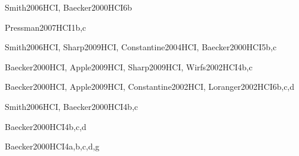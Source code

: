 \begin{syllabus}
	\begin{unit}{\HCIFoundations}{}{Smith2006HCI, Baecker2000HCI}{6}{b}
		\HCIFoundationsAllTopics
		\HCIFoundationsAllLearningOutcomes
	\end{unit}
	
	\begin{unit}{\PLObjectOrientedProgramming}{}{Pressman2007HCI}{1}{b,c}
		\PLObjectOrientedProgramming
	\end{unit}
	
	
	\begin{unit}{\HCIUsercentereddesignandtesting}{}{Smith2006HCI, Sharp2009HCI, Constantine2004HCI, Baecker2000HCI}{5}{b,c}
		\HCIUsercentereddesignandtestingAllTopics
		\HCIUsercentereddesignandtestingAllLearningOutcomes
	\end{unit}
	
	
	\begin{unit}{\HCIDesigningInteraction}{}{Baecker2000HCI, Apple2009HCI, Sharp2009HCI, Wirfs2002HCI}{4}{b,c}
		\HCIDesigningInteractionAllTopics
		\HCIDesigningInteractionAllLearningOutcomes
	\end{unit}
	
	\begin{unit}{\ARInterfacingandcommunication}{}{Baecker2000HCI, Apple2009HCI, Constantine2002HCI, Loranger2002HCI}{6}{b,c,d}
		\ARInterfacingandcommunicationAllTopics
		\ARInterfacingandcommunicationAllLearningOutcomes
	\end{unit}
	
	
	\begin{unit}{\IMMultimediaSystems}{}{Smith2006HCI, Baecker2000HCI}{4}{b,c}
		\IMMultimediaSystemsAllTopics
		\IMMultimediaSystemsAllLearningOutcomes
	\end{unit}
	
	\begin{unit}{\SPProfessionalCommunication}{}{Baecker2000HCI}{4}{b,c,d}
		\SPProfessionalCommunicationAllTopics
		\SPProfessionalCommunicationAllLearningOutcomes
	\end{unit}
	
	
	\begin{unit}{\HCIHumanfactorsandsecurity}{}{Baecker2000HCI}{4}{a,b,c,d,g}
		\HCIHumanfactorsandsecurityAllTopics
		\HCIHumanfactorsandsecurityAllLearningOutcomes
	\end{unit}
	
	\begin{coursebibliography}
	\end{coursebibliography}
	\end{syllabus}
	